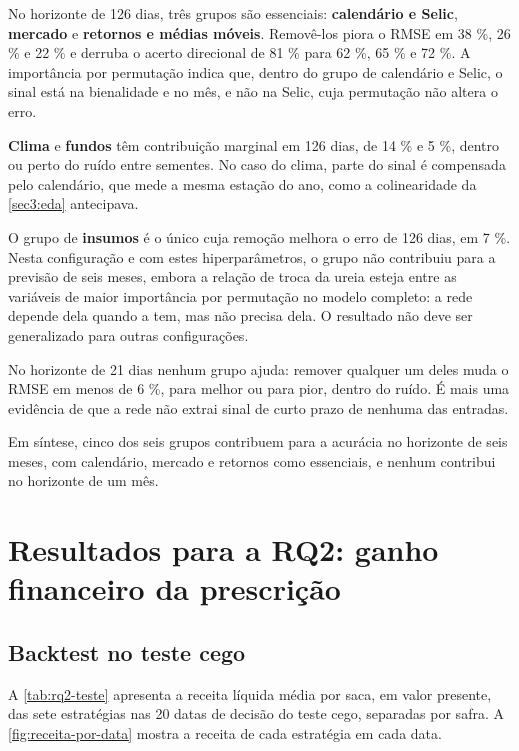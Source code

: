 \begin{alineas}
	\item No horizonte de 126 dias, três grupos são essenciais: \textbf{calendário e Selic}, \textbf{mercado} e \textbf{retornos e médias móveis}. Removê-los piora o RMSE em 38 \%, 26 \% e 22 \% e derruba o acerto direcional de 81 \% para 62 \%, 65 \% e 72 \%. A importância por permutação indica que, dentro do grupo de calendário e Selic, o sinal está na bienalidade e no mês, e não na Selic, cuja permutação não altera o erro.
	\item \textbf{Clima} e \textbf{fundos} têm contribuição marginal em 126 dias, de 14 \% e 5 \%, dentro ou perto do ruído entre sementes. No caso do clima, parte do sinal é compensada pelo calendário, que mede a mesma estação do ano, como a colinearidade da \autoref{sec3:eda} antecipava.
	\item O grupo de \textbf{insumos} é o único cuja remoção melhora o erro de 126 dias, em 7 \%. Nesta configuração e com estes hiperparâmetros, o grupo não contribuiu para a previsão de seis meses, embora a relação de troca da ureia esteja entre as variáveis de maior importância por permutação no modelo completo: a rede depende dela quando a tem, mas não precisa dela. O resultado não deve ser generalizado para outras configurações.
	\item No horizonte de 21 dias nenhum grupo ajuda: remover qualquer um deles muda o RMSE em menos de 6 \%, para melhor ou para pior, dentro do ruído. É mais uma evidência de que a rede não extrai sinal de curto prazo de nenhuma das entradas.
\end{alineas}

Em síntese, cinco dos seis grupos contribuem para a acurácia no horizonte de seis meses, com calendário, mercado e retornos como essenciais, e nenhum contribui no horizonte de um mês.

\section{Resultados para a RQ2: ganho financeiro da prescrição}\label{sec2:res-rq2}

\subsection{Backtest no teste cego}

A \autoref{tab:rq2-teste} apresenta a receita líquida média por saca, em valor presente, das sete estratégias nas 20 datas de decisão do teste cego, separadas por safra. A \autoref{fig:receita-por-data} mostra a receita de cada estratégia em cada data.

